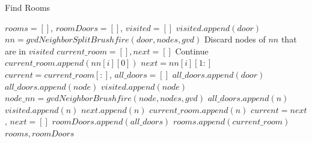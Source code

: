 \begin{algorithm}[!htb]
\caption{Find Rooms}
\label{alg:find_rooms}
\begin{algorithmic}[1]
        \State $rooms = []$, $roomDoors = []$, $visited = []$
            \State $visited.append(door)$
            \State $nn = gvdNeighborSplitBrushfire(door, nodes, gvd)$
            \State Discard nodes of $nn$ that are in $visited$
                \State $current\_room = [], next = []$
                    \State Continue
                \EndIf
                \State $current\_room.append(nn[i][0])$ 
                \State $next = nn[i][1:]$ 
                \State $current = current\_room[:]$, $all\_doors = []$
                \State $all\_doors.append(door)$
                            \State $all\_doors.append(node)$
                            \State $visited.append(node)$
                            \State $node\_nn = gvdNeighborBrushfire(node, nodes, gvd)$
                                    \State $all\_doors.append(n)$
                                    \State $visited.append(n)$
                                    \State $next.append(n)$
                                    \State $current\_room.append(n)$
                                \EndIf
                            \EndFor
                        \EndIf
                    \EndFor
                    \State $current = next$, $next = []$
                \EndWhile
                \State $roomDoors.append(all\_doors)$
                \State $rooms.append(current\_room)$
            \EndFor
        \EndFor  
        \State \Return $rooms, roomDoors$
\end{algorithmic}
\end{algorithm}


